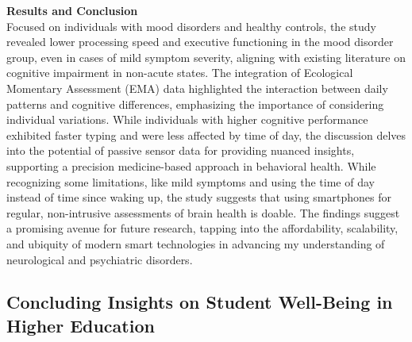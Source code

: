 \documentclass[11pt]{report}
\begin{document}
\newpage
\noindent \textbf{Results and Conclusion} \\
Focused on individuals with mood disorders and healthy controls, the study revealed lower processing speed and executive functioning in the mood disorder group, even in cases of mild symptom severity, aligning with existing literature on cognitive impairment in non-acute states. The integration of Ecological Momentary Assessment (EMA) data highlighted the interaction between daily patterns and cognitive differences, emphasizing the importance of considering individual variations. While individuals with higher cognitive performance exhibited faster typing and were less affected by time of day, the discussion delves into the potential of passive sensor data for providing nuanced insights, supporting a precision medicine-based approach in behavioral health. While recognizing some limitations, like mild symptoms and using the time of day instead of time since waking up, the study suggests that using smartphones for regular, non-intrusive assessments of brain health is doable. The findings suggest a promising avenue for future research, tapping into the affordability, scalability, and ubiquity of modern smart technologies in advancing my understanding of neurological and psychiatric disorders.

\subsection{Concluding Insights on Student Well-Being in Higher Education}
\end{document}

